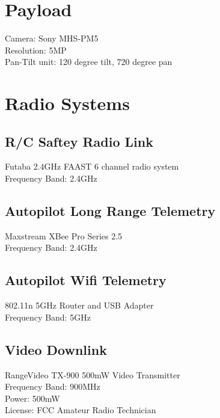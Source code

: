 \documentclass[10pt]{article}
\begin{document}
\begin{multicols}{2}
\section{Payload}
Camera: Sony MHS-PM5
\\Resolution: 5MP
\\Pan-Tilt unit: 120 degree tilt, 720 degree pan

\section{Radio Systems}
\subsection{R/C Saftey Radio Link}
Futaba 2.4GHz FAAST 6 channel radio system
\\Frequency Band: 2.4GHz
\subsection{Autopilot Long Range Telemetry}
Maxstream XBee Pro Series 2.5
\\Frequency Band: 2.4GHz
\subsection{Autopilot Wifi Telemetry}
802.11n 5GHz Router and USB Adapter
\\Frequency Band: 5GHz
\subsection{Video Downlink}
RangeVideo TX-900 500mW Video Transmitter
\\Frequency Band: 900MHz
\\Power: 500mW
\\License: FCC Amateur Radio Technician

\end{multicols}
\end{document}
